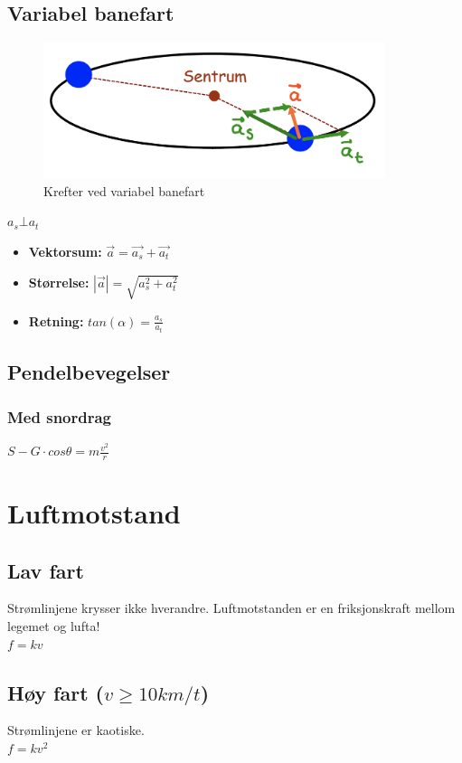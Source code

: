 \documentclass[12pt]{article}
\begin{document}
\subsection{Variabel banefart}
\begin{figure} [H]
    \centering
    \includegraphics[width=10cm]{images/circle.png}
    \caption{Krefter ved variabel banefart}
\end{figure}


$a_s \bot a_t$

\begin{itemize}
    \item[] \textbf{Vektorsum:} $\Vec{a} = \Vec{a_s} + \Vec{a_t}$
    \item[] \textbf{Størrelse:} $|\Vec{a}| = \sqrt{a_s^2+a_t^2}$
    \item[] \textbf{Retning:} $tan (\alpha) = \frac{a_s}{a_t}$
\end{itemize}

    

\subsection{Pendelbevegelser}
\subsubsection{Med snordrag}
$S-G \cdot cos\theta = m\frac{v^2}{r}$


\section{Luftmotstand}
\subsection{Lav fart}
Strømlinjene krysser ikke hverandre.
Luftmotstanden er en friksjonskraft mellom legemet og lufta!\\
$f = kv$
\pagebreak
\subsection{Høy fart ($v \geq 10km/t $)}
Strømlinjene er kaotiske.\\
$f = kv^2$
\end{document}
